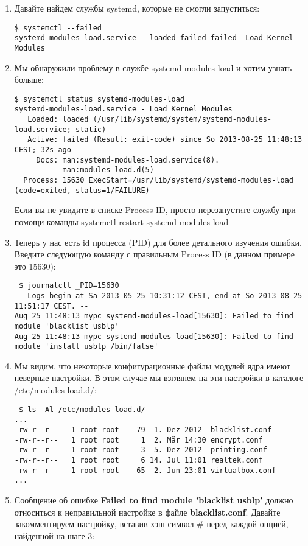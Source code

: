 \documentclass[a4paper,10pt,twoside]{article}
\begin{document}
\begin{enumerate}
 \item Давайте найдем службы systemd, которые не смогли запуститься:
\begin{verbatim}
$ systemctl --failed
systemd-modules-load.service   loaded failed failed  Load Kernel Modules                                                                        \end{verbatim} 
\item Мы обнаружили проблему в службе systemd-modules-load и хотим узнать больше:
\begin{verbatim}
$ systemctl status systemd-modules-load
systemd-modules-load.service - Load Kernel Modules
   Loaded: loaded (/usr/lib/systemd/system/systemd-modules-load.service; static)
   Active: failed (Result: exit-code) since So 2013-08-25 11:48:13 CEST; 32s ago
     Docs: man:systemd-modules-load.service(8).
           man:modules-load.d(5)
  Process: 15630 ExecStart=/usr/lib/systemd/systemd-modules-load (code=exited, status=1/FAILURE)
\end{verbatim} 
Если вы не увидите в списке Process ID, просто перезапустите службу при помощи команды systemctl restart systemd-modules-load
\item Теперь у нас есть id процесса (PID) для более детального изучения ошибки. Введите следующую команду с правильным Process ID (в данном примере это 15630):
\begin{verbatim}
 $ journalctl _PID=15630
-- Logs begin at Sa 2013-05-25 10:31:12 CEST, end at So 2013-08-25 11:51:17 CEST. --
Aug 25 11:48:13 mypc systemd-modules-load[15630]: Failed to find module 'blacklist usblp'
Aug 25 11:48:13 mypc systemd-modules-load[15630]: Failed to find module 'install usblp /bin/false'
\end{verbatim}
\item Мы видим, что некоторые конфигурационные файлы модулей ядра имеют неверные настройки. В этом случае мы взглянем на эти настройки в каталоге /etc/modules-load.d/:
\begin{verbatim}
 $ ls -Al /etc/modules-load.d/
...
-rw-r--r--   1 root root    79  1. Dez 2012  blacklist.conf
-rw-r--r--   1 root root     1  2. Mär 14:30 encrypt.conf
-rw-r--r--   1 root root     3  5. Dez 2012  printing.conf
-rw-r--r--   1 root root     6 14. Jul 11:01 realtek.conf
-rw-r--r--   1 root root    65  2. Jun 23:01 virtualbox.conf
...
\end{verbatim} 
\item Сообщение об ошибке \textbf{Failed to find module 'blacklist usblp'} должно относиться к неправильной настройке в файле \textbf{blacklist.conf}. Давайте закомментируем настройку, вставив хэш-символ \# перед каждой опцией, найденной на шаге 3:

\end{enumerate}
\end{document}
